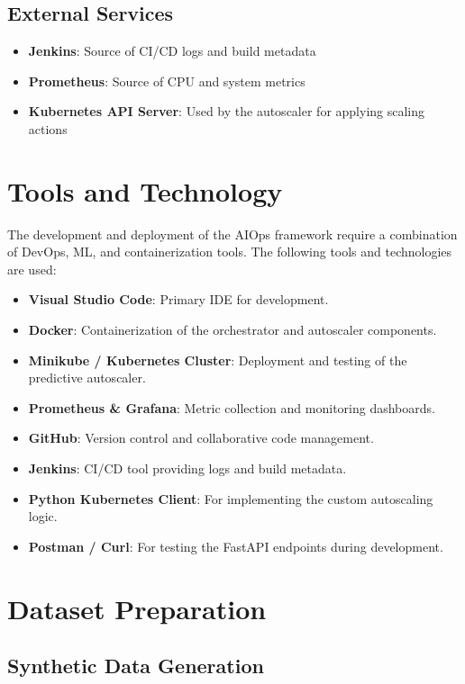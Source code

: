 \documentclass[a4paper,14pt,onecolumn]{report}
\begin{document}
\subsection{External Services}
\begin{itemize}
    \item \textbf{Jenkins}: Source of CI/CD logs and build metadata
    \item \textbf{Prometheus}: Source of CPU and system metrics
    \item \textbf{Kubernetes API Server}: Used by the autoscaler for applying scaling actions
\end{itemize}

\section{Tools and Technology}

The development and deployment of the AIOps framework require a combination of DevOps, ML, and containerization tools. The following tools and technologies are used:

\begin{itemize}
    \item \textbf{Visual Studio Code}: Primary IDE for development.
    \item \textbf{Docker}: Containerization of the orchestrator and autoscaler components.
    \item \textbf{Minikube / Kubernetes Cluster}: Deployment and testing of the predictive autoscaler.
    \item \textbf{Prometheus \& Grafana}: Metric collection and monitoring dashboards.
    \item \textbf{GitHub}: Version control and collaborative code management.
    \item \textbf{Jenkins}: CI/CD tool providing logs and build metadata.
    \item \textbf{Python Kubernetes Client}: For implementing the custom autoscaling logic.
    \item \textbf{Postman / Curl}: For testing the FastAPI endpoints during development.
\end{itemize}

\section{Dataset Preparation}

\subsection{Synthetic Data Generation}
\end{document}
